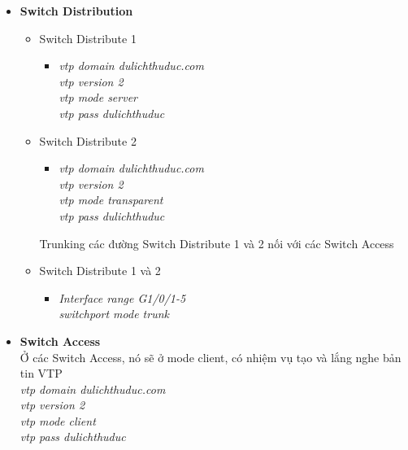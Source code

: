 \documentclass[a4paper, 12pt]{article}
\begin{document}
\renewcommand{\labelitemi}{$\blacksquare$}
\renewcommand\labelitemii{$\nabla$}
\renewcommand\labelitemiii{$\square$}
\begin{itemize}
  \item \textbf{Switch Distribution}
    \begin{itemize}
    \item Switch Distribute 1
    \begin{itemize}
      \item \textit{vtp domain dulichthuduc.com\\
                    vtp version 2\\
                    vtp mode server\\
                    vtp pass dulichthuduc}
    \end{itemize}
    \item Switch Distribute 2
     \begin{itemize}
      \item \textit{vtp domain dulichthuduc.com\\
                    vtp version 2\\
                    vtp mode transparent \\
                    vtp pass dulichthuduc}  
    \end{itemize}
    \hspace*{1cm} Trunking các đường  Switch Distribute 1 và 2 nối với các Switch Access  \\
     \item Switch Distribute 1 và 2
     \begin{itemize}
      \item \textit{Interface range G1/0/1-5\\
                    switchport mode trunk}   
    \end{itemize}
   \end{itemize}
  \item \textbf{Switch Access}\\
\hspace*{1cm} Ở các Switch Access, nó sẽ ở mode client, có nhiệm vụ tạo và lắng nghe bản tin VTP\\
\hspace*{2cm}\textit{vtp domain dulichthuduc.com\\
 \hspace*{2cm}  vtp version 2\\
 \hspace*{2cm}  vtp mode client\\
 \hspace*{2cm}  vtp pass dulichthuduc\\} 

\end{itemize}
\end{document}
